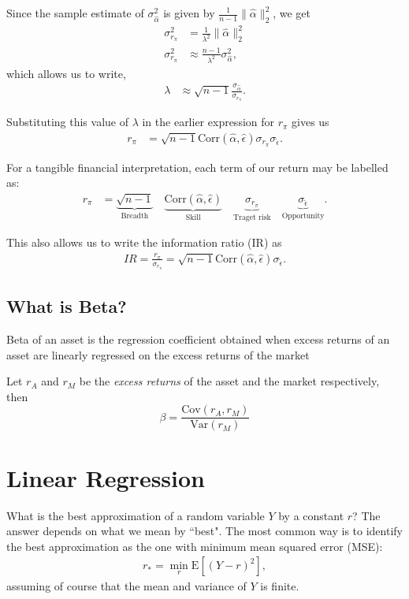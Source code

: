 \documentclass{amsart}
\theoremstyle{plain}
\numberwithin{equation}{section}
\begin{document}
Since the sample estimate of ${\sigma}_{\hat{\alpha}}^{2}$ is given by 
$\frac{1}{n-1} \|\hat{\alpha}\|^2_2$, 
we get
\begin{align*}
\sigma_{r_{\pi}}^{2} &= \frac{1}{\lambda^2}\|\hat{\alpha}\|_{2}^{2}\\
\sigma_{r_{\pi}}^{2} & \approx \frac{n-1}{\lambda^2} \sigma_{\hat{\alpha}}^{2},
\end{align*}
which allows us to write,
\begin{align*}
\lambda & \approx \sqrt{n-1} \frac{ \sigma_{\hat{\alpha}}}{\sigma_{r_{\pi}}}.
\end{align*}

Substituting this value of $\lambda$ in the earlier expression for $r_{\pi}$ gives us
\begin{align*}
r_{\pi} &= \sqrt{n-1}
\mathrm{Corr}(\hat{\alpha}, \hat{\epsilon})
\sigma_{r_{\pi}}
\sigma_{\hat{\epsilon}}.
\end{align*}

For a tangible  financial interpretation, each term of our
return may be labelled as:
\begin{align*}
r_{\pi} &= \underbrace{\sqrt{n-1}}_\text{Breadth} \quad
\underbrace{\mathrm{Corr}(\hat{\alpha}, \hat{\epsilon})}_\text{Skill} \quad
\underbrace{\sigma_{r_{\pi}}}_\text{Traget risk} \quad
\underbrace{\sigma_{\hat{\epsilon}}}_\text{Opportunity}.
\end{align*}

This also allows us to write the information ratio (IR) as
\begin{align*}
IR = \frac{r_{\pi}}{\sigma_{r_\pi}} = 
\sqrt{n-1}
\mathrm{Corr}(\hat{\alpha}, \hat{\epsilon})
\sigma_{\hat{\epsilon}}.
\end{align*}

\subsection*{What is Beta?}
Beta of an asset is the regression coefficient
obtained when excess returns of an asset are 
linearly regressed on the excess returns of the market

Let $r_A$ and $r_M$ be the \emph{excess returns} 
of the asset and the market respectively, then
\begin{equation}
\beta = \frac{\mathrm{Cov}(r_A, r_M)}{\mathrm{Var}(r_M)}
\end{equation}

\section*{Linear Regression}
What is the best approximation of a random variable $Y$ by a constant $r$? The answer
depends on what we mean by ``best". The most common way is to identify the best 
approximation as the one with minimum mean squared error (MSE):
\begin{align*}
r_* = \min_{r} \mathrm{E}[(Y-r)^2],
\end{align*}
assuming of course that the mean and variance of $Y$ is finite. 
\end{document}
